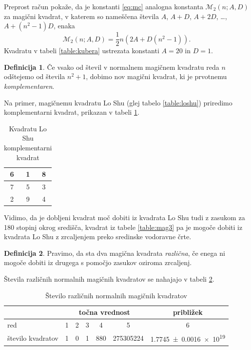 \documentclass[a4paper,12pt]{article}
\newcommand{\m}{\mathcal{M}_2}
\newcommand{\pojem}[1]{\emph{\color{purple}#1}}
\theoremstyle{definition}
\newtheorem{definicija}{Definicija}
\theoremstyle{plain}
\newenvironment{magic}[3]
   {\begin{table}[!ht]
      \centering
      \caption{#2}
      \label{#3}
      \begin{tabular}{|*{#1}{c|}}
   }
   {\end{tabular}
      \end{table}}
\begin{document}
Preprost račun pokaže, da je konstanti \eqref{eq:mc} analogna konstanta
\(\m(n;A,D)\) za magični kvadrat, v katerem so nameščena števila
\(A\), \(A+D\), \(A+2D\), \ldots, \(A+(n^2-1)D\), enaka
\[
   \m(n;A,D) = \frac{1}{2} n \left(2A+D(n^2-1)\right).
\]
Kvadratu v tabeli \ref{table:kubera} ustrezata konstanti \(A=20\) in \(D=1\). %

\begin{definicija}
   Če vsako od števil v normalnem magičnem kvadratu reda \(n\) odštejemo
   od števila \(n^2+1\), dobimo nov magični kvadrat, ki je prvotnemu
   \pojem{komplementaren}.
\end{definicija}

Na primer, magičnemu kvadratu Lo Shu (glej tabelo \ref{table:loshu}) priredimo
komplementarni kvadrat, prikazan v tabeli \ref{table:closhu}. %
%
\begin{magic}{3}{Kvadratu Lo Shu komplementarni kvadrat}{table:closhu}
   \hline
   6 & 1 & 8 \\ \hline
   7 & 5 & 3 \\ \hline
   2 & 9 & 4\\ \hline
\end{magic}

Vidimo, da je dobljeni kvadrat moč dobiti iz kvadrata Lo Shu tudi z zasukom za
180 stopinj okrog središča, kvadrat iz tabele \ref{table:mag3} pa je mogoče dobiti
iz kvadrata Lo Shu z zrcaljenjem preko sredinske vodoravne črte. %

\begin{definicija}
   Pravimo, da sta dva magična kvadrata \pojem{različna}, če enega ni mogoče dobiti
   iz drugega s pomočjo zasukov oziroma zrcaljenj.
\end{definicija}

Števila različnih normalnih magičnih kvadratov se nahajajo v tabeli \ref{table:stevila}.

\begin{table}[!ht]
   \centering
   \caption{Število različnih normalnih magičnih kvadratov}
   \label{table:stevila}
   \begin{tabular}{lcccccc}\toprule
      & \multicolumn{5}{c}{točna vrednost} & približek \\
      \midrule
      red & 1 & 2 & 3 & 4 & 5 & 6 \\
      število kvadratov & 1 & 0 & 1 & 880 & \num{275305224} & \num[separate-uncertainty]{1.7745 \pm 0.0016 e19} \\
      \bottomrule
   \end{tabular}
\end{table}
\end{document}
